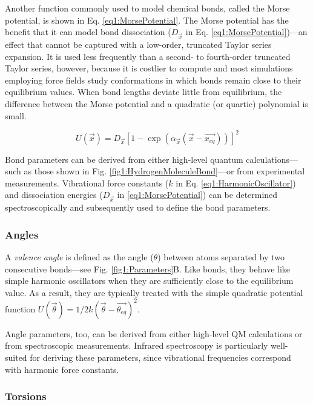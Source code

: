 Another function commonly used to model chemical bonds, called the Morse
potential, is shown in Eq. \ref{eq1:MorsePotential}. The Morse potential has the
benefit that it can model bond dissociation ($D_{\vec{x}}$ in Eq.
\ref{eq1:MorsePotential})---an effect that cannot be captured with a low-order,
truncated Taylor series expansion. It is used less frequently than a second- to
fourth-order truncated Taylor series, however, because it is costlier to compute
and most simulations employing force fields study conformations in which bonds
remain close to their equilibrium values. When bond lengths deviate little from
equilibrium, the difference between the Morse potential and a quadratic (or
quartic) polynomial is small. \cite{Cramer_Book_EssentialsCompChem_2004}

\begin{equation}
   U(\vec{x}) = D_{\vec{x}} \left [ 1 - \exp \left ( \alpha _ {\vec{x}} (
                \vec{x} - \vec{x_{eq}} ) \right ) \right ] ^ 2
   \label{eq1:MorsePotential}
\end{equation}

Bond parameters can be derived from either high-level quantum
calculations---such as those shown in Fig. \ref{fig1:HydrogenMoleculeBond}---or
from experimental measurements. Vibrational force constants ($k$ in Eq.
\ref{eq1:HarmonicOscillator}) and dissociation energies ($D_{\vec{x}}$ in
\ref{eq1:MorsePotential}) can be determined spectroscopically and subsequently
used to define the bond parameters.

\subsubsection{Angles}

A \emph{valence angle} is defined as the angle ($\theta$) between atoms
separated by two consecutive bonds---see Fig. \ref{fig1:Parameters}B. Like
bonds, they behave like simple harmonic oscillators when they are sufficiently
close to the equilibrium value. As a result, they are typically treated with the
simple quadratic potential function $U(\vec{\theta}) = 1/2 k (\vec{\theta} -
\vec{\theta _ {eq}}) ^ 2$.

Angle parameters, too, can be derived from either high-level QM calculations or
from spectroscopic measurements. Infrared spectroscopy is particularly
well-suited for deriving these parameters, since vibrational frequencies
correspond with harmonic force constants.

\subsubsection{Torsions}


